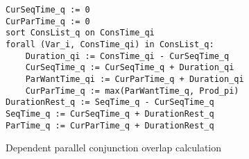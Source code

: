 



\begin{algorithm}
\begin{verbatim}
CurSeqTime_q := 0
CurParTime_q := 0
sort ConsList_q on ConsTime_qi
forall (Var_i, ConsTime_qi) in ConsList_q:
    Duration_qi := ConsTime_qi - CurSeqTime_q
    CurSeqTime_q := CurSeqTime_q + Duration_qi
    ParWantTime_qi := CurParTime_q + Duration_qi
    CurParTime_q := max(ParWantTime_q, Prod_pi)
DurationRest_q := SeqTime_q - CurSeqTime_q
SeqTime_q := CurSeqTime_q + DurationRest_q
ParTime_q := CurParTime_q + DurationRest_q
\end{verbatim}
\caption{Dependent parallel conjunction overlap calculation}
\label{alg:dep_par_conj_overlap_simple}
\end{algorithm}

